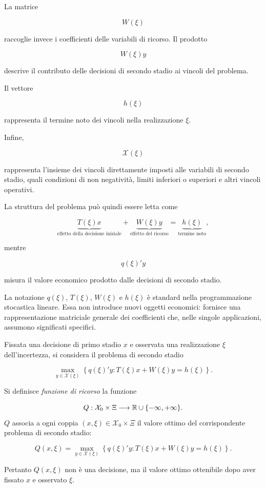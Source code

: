 La matrice

\[
W(\xi)
\]

\noindent raccoglie invece i coefficienti delle variabili di ricorso. Il prodotto

\[
W(\xi)y
\]

\noindent descrive il contributo delle decisioni di secondo stadio ai vincoli del
problema.

Il vettore

\[
h(\xi)
\]

\noindent rappresenta il termine noto dei vincoli nella realizzazione $\xi$.

Infine,

\[
\mathcal X(\xi)
\]

\noindent rappresenta l'insieme dei vincoli direttamente imposti alle variabili di
secondo stadio, quali condizioni di non negativit\`a, limiti inferiori o
superiori e altri vincoli operativi.

La struttura del problema pu\`o quindi essere letta come

\[
\underbrace{T(\xi)x}_{\text{effetto della decisione iniziale}}
+
\underbrace{W(\xi)y}_{\text{effetto del ricorso}}
=
\underbrace{h(\xi)}_{\text{termine noto}},
\]

\noindent mentre

\[
q(\xi)'y
\]

\noindent misura il valore economico prodotto dalle decisioni di secondo stadio.

La notazione $q(\xi)$, $T(\xi)$, $W(\xi)$ e $h(\xi)$ \`e standard nella
programmazione stocastica lineare. Essa non introduce nuovi oggetti
economici: fornisce una rappresentazione matriciale generale dei
coefficienti che, nelle singole applicazioni, assumono significati
specifici.

\begin{definition}
Fissata una decisione di primo stadio $x$ e osservata una realizzazione
$\xi$ dell'incertezza, si considera il problema di secondo stadio

\[
\max_{y\in \mathcal X(\xi)}
\left\{
q(\xi)'y:
T(\xi)x+W(\xi)y=h(\xi)
\right\}.
\]

Si definisce \emph{funzione di ricorso} la funzione

\[
Q:\mathcal X_0\times\Xi\longrightarrow\mathbb{R}\cup\{-\infty,+\infty\}.
\]
$Q$ associa a ogni coppia $(x,\xi) \in \mathcal X_0\times\Xi$ il valore ottimo del corrispondente
problema di secondo stadio:

\begin{equation}
Q(x,\xi)
=
\max_{y\in \mathcal X(\xi)}
\left\{
q(\xi)'y:
T(\xi)x+W(\xi)y=h(\xi)
\right\}.
\label{eq:cap14-definizione-formale-ricorso}
\end{equation}

Pertanto $Q(x,\xi)$ non \`e una decisione, ma il valore ottimo ottenibile
dopo aver fissato $x$ e osservato $\xi$.
\end{definition}

